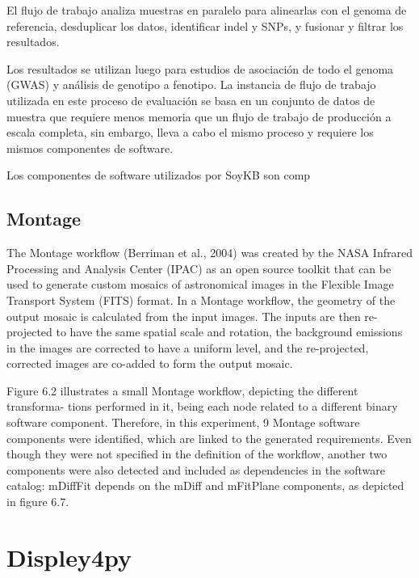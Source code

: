 El flujo de trabajo analiza muestras en paralelo para alinearlas con el genoma de referencia, desduplicar los datos, identificar indel y SNPs, y fusionar y filtrar los resultados.

Los resultados se utilizan luego para estudios de asociación de todo el genoma (GWAS) y análisis de genotipo a fenotipo. La instancia de flujo de trabajo utilizada en este proceso de evaluación se basa en un conjunto de datos de muestra que requiere menos memoria que un flujo de trabajo de producción a escala completa, sin embargo, lleva a cabo el mismo proceso y requiere los mismos componentes de software.


Los componentes de software utilizados por SoyKB son comp




\subsection{Montage}

The Montage workflow (Berriman et al., 2004) was created by the NASA Infrared Processing and Analysis Center (IPAC) as an open source toolkit that can be used to generate custom mosaics of astronomical images in the Flexible Image Transport System (FITS) format. In a Montage workflow, the geometry of the output mosaic is calculated from the input images. The inputs are then re-projected to have the same spatial scale and rotation, the background emissions in the images are corrected to have a uniform level, and the re-projected, corrected images are co-added to form the output mosaic.


Figure 6.2 illustrates a small Montage workflow, depicting the different transforma- tions performed in it, being each node related to a different binary software component. Therefore, in this experiment, 9 Montage software components were identified, which are linked to the generated requirements. Even though they were not specified in the definition of the workflow, another two components were also detected and included as dependencies in the software catalog: mDiffFit depends on the mDiff and mFitPlane components, as depicted in figure 6.7.




\section{Displey4py}

